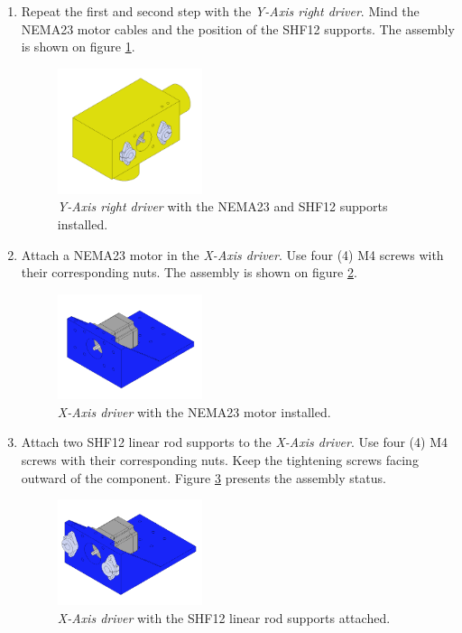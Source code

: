 \documentclass{article}
\begin{document}
\begin{enumerate}
    \item Repeat the first and second step with the \textit{Y-Axis right driver}. Mind the NEMA23 motor cables and the position of the SHF12 supports. The assembly is shown on figure \ref{fig:ya_step_3}.
    
    \begin{figure}[H]
        \centering
        \includegraphics[width=0.4\textwidth]{images/y_axis/step_C.png}
        \caption{\textit{Y-Axis right driver} with the NEMA23 and SHF12 supports installed.}
        \label{fig:ya_step_3}
    \end{figure}
    
    \item Attach a NEMA23 motor in the \textit{X-Axis driver}. Use four (4) M4 screws with their corresponding nuts. The assembly is shown on figure \ref{fig:ya_step_4}.
    
    \begin{figure}[H]
        \centering
        \includegraphics[width=0.4\textwidth]{images/y_axis/step_D.png}
        \caption{\textit{X-Axis driver} with the NEMA23 motor installed.}
        \label{fig:ya_step_4}
    \end{figure}
    
    \item Attach two SHF12 linear rod supports to the \textit{X-Axis driver}. Use four (4) M4 screws with their corresponding nuts. Keep the tightening screws facing outward of the component. Figure \ref{fig:ya_step_5} presents the assembly status.
    
    \begin{figure}[H]
        \centering
        \includegraphics[width=0.4\textwidth]{images/y_axis/step_E.png}
        \caption{\textit{X-Axis driver} with the SHF12 linear rod supports attached.}
        \label{fig:ya_step_5}
    \end{figure}
    

\end{enumerate}
\end{document}
